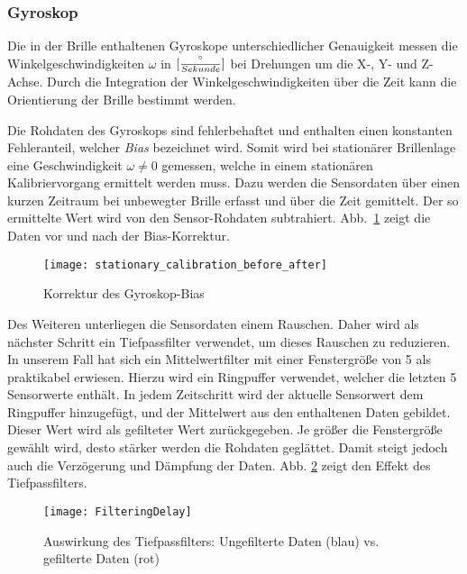 \subsubsection{Gyroskop}
\label{headtracking_imu_gyro_subsubsec}

Die in der Brille enthaltenen Gyroskope unterschiedlicher Genauigkeit messen die Winkelgeschwindigkeiten $\omega$ in $[{\degree \over Sekunde}]$ bei Drehungen um die X-, Y- und Z-Achse. Durch
die Integration der Winkelgeschwindigkeiten über die Zeit kann die
Orientierung der Brille bestimmt werden.  

Die Rohdaten des Gyroskops sind fehlerbehaftet und enthalten einen
konstanten Fehleranteil, welcher \emph{Bias} bezeichnet wird. Somit wird
bei stationärer Brillenlage eine Geschwindigkeit $\omega \neq 0$
gemessen, welche in einem stationären Kalibriervorgang ermittelt werden
muss. Dazu werden die Sensordaten über einen kurzen Zeitraum bei
unbewegter Brille erfasst und über die Zeit gemittelt. Der so ermittelte
Wert wird von den Sensor-Rohdaten subtrahiert. Abb.~\ref{fig:gyro_bias}
zeigt die Daten vor und nach der Bias-Korrektur.

\begin{figure}[h]
   \centering
   \texttt{[image: stationary\_calibration\_before\_after]}
   \caption{Korrektur des Gyroskop-Bias}
   \label{fig:gyro_bias}
\end{figure}

Des Weiteren unterliegen die Sensordaten einem Rauschen. Daher wird als
nächster Schritt ein Tiefpassfilter verwendet, um dieses Rauschen zu
reduzieren. In unserem Fall hat sich ein Mittelwertfilter mit einer
Fenstergröße von 5 als praktikabel erwiesen. Hierzu wird ein Ringpuffer
verwendet, welcher die letzten 5 Sensorwerte enthält. In jedem
Zeitschritt wird der aktuelle Sensorwert dem Ringpuffer hinzugefügt, und
der Mittelwert aus den enthaltenen Daten gebildet. Dieser Wert wird als
gefilteter Wert zurückgegeben. Je größer die Fenstergröße gewählt wird,
desto stärker werden die Rohdaten geglättet. Damit steigt jedoch auch
die Verzögerung und Dämpfung der Daten. Abb. \ref{fig:lowpass-delay}
zeigt den Effekt des Tiefpassfilters.

\begin{figure}[h]
   \centering
   \texttt{[image: FilteringDelay]}
   \caption{Auswirkung des Tiefpassfilters: Ungefilterte Daten (blau) vs. gefilterte Daten (rot)}
   \label{fig:lowpass-delay}
\end{figure}

